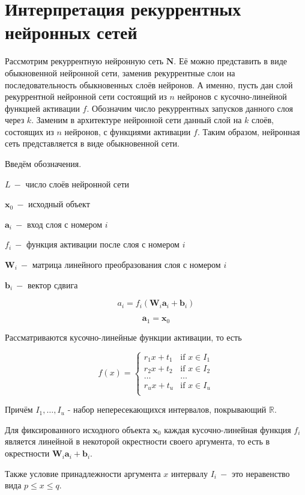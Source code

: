 \documentclass[a4paper, 12pt]{article}
\begin{document}
\section{Интерпретация рекуррентных нейронных сетей}

Рассмотрим рекуррентную нейронную сеть $\mathbf{N}$. Её можно представить в виде обыкновенной нейронной сети, заменив рекуррентные слои на последовательность обыкновенных слоёв нейронов. А именно, пусть дан слой рекуррентной нейронной сети состоящий из $n$ нейронов с кусочно-линейной функцией активации $f$. Обозначим число рекуррентных запусков данного слоя через $k$. Заменим в архитектуре нейронной сети данный слой на $k$ слоёв, состоящих из $n$ нейронов, с функциями активации $f$. Таким образом, нейронная сеть представляется в виде обыкновенной сети.

Введём обозначения.

$L~-$ число слоёв нейронной сети

$\mathbf{x}_0~-$ исходный объект

$\mathbf{a}_i~-$ вход слоя с номером $i$

$f_i~-$ функция активации после слоя с номером $i$

$\mathbf{W}_i~-$ матрица линейного преобразования слоя с номером $i$

$\mathbf{b}_i~-$ вектор сдвига

$$a_i=f_i\left(\mathbf{W}_i \mathbf{a}_{i} + \mathbf{b}_i\right)$$

$$\mathbf{a}_1=\mathbf{x}_0$$

Рассматриваются кусочно-линейные функции активации, то есть

\[f(x)=\left\{
\begin{array}{ll}
      r_1 x+t_1 & \text{if } x\in I_1 \\
      r_2 x+t_2 & \text{if } x\in I_2 \\
      \dots&\dots\\
      r_u x+t_u & \text{if } x\in I_u \\
\end{array} 
\right. \]

Причём $I_1,\dots,I_u$ - набор непересекающихся интервалов, покрывающий $\mathbb{R}$.

Для фиксированного исходного объекта $\mathbf{x}_0$ каждая кусочно-линейная функция $f_i$ является линейной в некоторой окрестности своего аргумента, то есть в окрестности $\mathbf{W}_i \mathbf{a}_{i} + \mathbf{b}_i$.

Также условие принадлежности аргумента $x$ интервалу $I_i~-$ это неравенство вида $p \leq x \leq q$.
\end{document}
